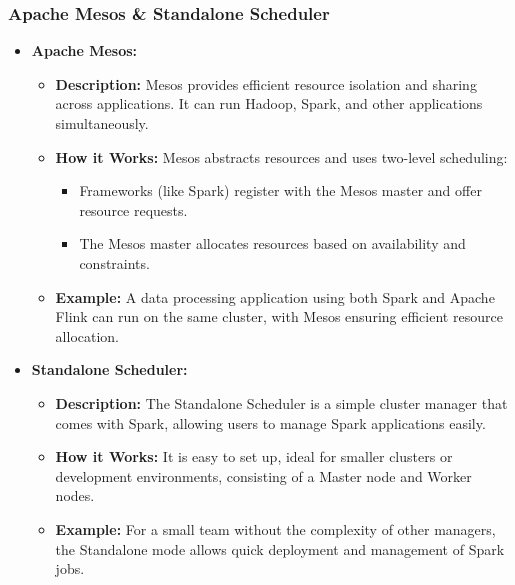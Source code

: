 \documentclass[aspectratio=169]{beamer}
\begin{document}
\begin{frame}[fragile]
    \frametitle{Apache Mesos & Standalone Scheduler}
    \begin{itemize}
        \item \textbf{Apache Mesos:}
        \begin{itemize}
            \item \textbf{Description:} Mesos provides efficient resource isolation and sharing across applications. It can run Hadoop, Spark, and other applications simultaneously.
            
            \item \textbf{How it Works:} 
            Mesos abstracts resources and uses two-level scheduling:
            \begin{itemize}
                \item Frameworks (like Spark) register with the Mesos master and offer resource requests.
                \item The Mesos master allocates resources based on availability and constraints.
            \end{itemize}
            
            \item \textbf{Example:} A data processing application using both Spark and Apache Flink can run on the same cluster, with Mesos ensuring efficient resource allocation.
        \end{itemize}
        
        \item \textbf{Standalone Scheduler:}
        \begin{itemize}
            \item \textbf{Description:} The Standalone Scheduler is a simple cluster manager that comes with Spark, allowing users to manage Spark applications easily.
            
            \item \textbf{How it Works:} It is easy to set up, ideal for smaller clusters or development environments, consisting of a Master node and Worker nodes.
            
            \item \textbf{Example:} For a small team without the complexity of other managers, the Standalone mode allows quick deployment and management of Spark jobs.
        \end{itemize}
    \end{itemize}
\end{frame}
\end{document}
